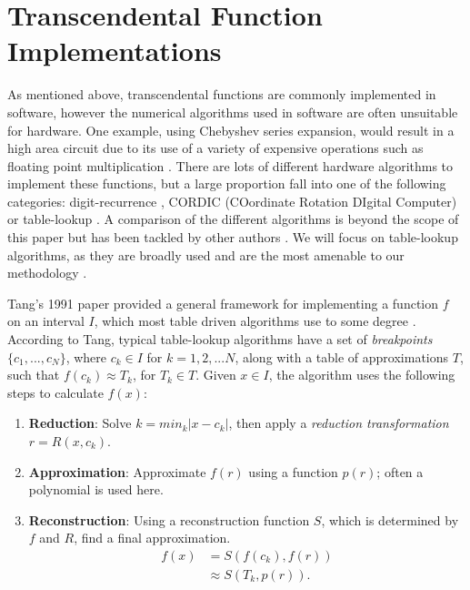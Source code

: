 \documentclass{fac}
\newcommand{\abs}[1]{\lvert#1\rvert}
\begin{document}
\section{Transcendental Function Implementations}
\label{trans functs}

As mentioned above, transcendental functions are commonly implemented in software, however the numerical algorithms used in software are often unsuitable for hardware. One example, using Chebyshev series expansion, would result in a high area circuit due to its use of a variety of expensive operations such as floating point multiplication \cite{fowkes1993hardware}. There are lots of different hardware algorithms to implement these functions, but a large proportion fall into one of the following categories: digit-recurrence \cite{bajard1994bkm,1030708}, CORDIC  (COordinate Rotation DIgital Computer) \cite{volder1959cordic,andraka1998survey,10.1145/1478786.1478840} or table-lookup \cite{tang1991table,story1999new}. A comparison of the different algorithms is beyond the scope of this paper but has been tackled by other authors \cite{tang1991table,pineiro2004algorithm}. We will focus on table-lookup algorithms, as they are broadly used and are the most amenable to our methodology .

Tang's 1991 paper provided a general framework for implementing a function $f$ on an interval $I$, which most table driven algorithms use to some degree \cite{tang1991table}. According to Tang, typical table-lookup algorithms have a set of \textit{breakpoints} $\{c_1, ...,c_N\}$, where $c_k \in I$ for $k=1, 2, ... N$, along with a table of approximations $T$, such that $f(c_k) \approx T_k$, for $T_k \in T$. Given $x \in I$, the algorithm uses the following steps to calculate $f(x)$:
\begin{enumerate}

\item \textbf{Reduction}: Solve $k = min_k \abs{x-c_k}$, then apply a \textit{reduction transformation} $r = R(x,c_k)$.

\item \textbf{Approximation}: Approximate $f(r)$ using a function $p(r)$; often a polynomial is used here.

\item \textbf{Reconstruction}: Using a reconstruction function $S$, which is determined by $f$ and $R$, find a final approximation.
\begin{align*}
    f(x) &= S(f(c_k),f(r)) \\
         &\approx S(T_k,p(r)).
\end{align*}

\end{enumerate} 
\end{document}
